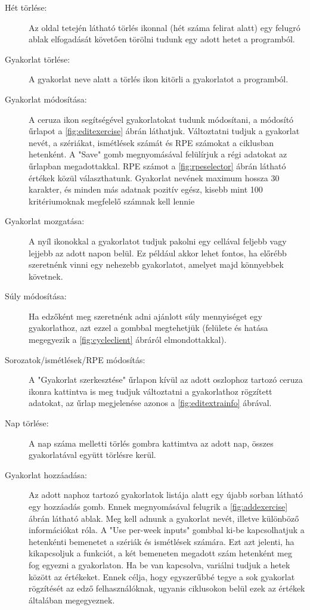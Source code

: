 \begin{description}
	\item[Hét törlése:] Az oldal tetején látható törlés ikonnal (hét száma felirat alatt) egy felugró ablak elfogadását követően törölni tudunk egy adott hetet a programból.
	\item[Gyakorlat törlése:] A gyakorlat neve alatt a törlés ikon kitörli a gyakorlatot a programból.
	\item[Gyakorlat módosítása:] A ceruza ikon segítségével gyakorlatokat tudunk módosítani, a módosító űrlapot a \ref{fig:editexercise} ábrán láthatjuk. Változtatni tudjuk a gyakorlat nevét, a szériákat, ismétlések számát és RPE számokat a ciklusban hetenként. A "Save" gomb megnyomásával felülírjuk a régi adatokat az űrlapban megadottakkal. RPE számot a \ref{fig:rpeselector} ábrán látható értékek közül választhatunk.
	Gyakorlat nevének maximum hossza 30 karakter, és minden más adatnak pozitív egész, kisebb mint 100 kritériumoknak megfelelő számnak kell lennie
	\item[Gyakorlat mozgatása:] A nyíl ikonokkal a gyakorlatot tudjuk pakolni egy cellával feljebb vagy lejjebb az adott napon belül. Ez például akkor lehet fontos, ha előrébb szeretnénk vinni egy nehezebb gyakorlatot, amelyet majd könnyebbek követnek.
	\item[Súly módosítása:] Ha edzőként meg szeretnénk adni ajánlott súly mennyiséget egy gyakorlathoz, azt ezzel a gombbal megtehetjük (felülete és hatása megegyezik a \ref{fig:cycleclient} ábráról elmondottakkal).
	\item[Sorozatok/ismétlések/RPE módosítás:] A "Gyakorlat szerkesztése" űrlapon kívül az adott oszlophoz tartozó ceruza ikonra kattintva is meg tudjuk változtatni a gyakorlathoz rögzített adatokat, az űrlap megjelenése azonos a \ref{fig:editextrainfo} ábrával.
	\item[Nap törlése:] A nap száma melletti törlés gombra kattimtva az adott nap, összes gyakorlatával együtt törlésre kerül.
	\item[Gyakorlat hozzáadása:] Az adott naphoz tartozó gyakorlatok listája alatt egy újabb sorban látható egy hozzáadás gomb. Ennek megnyomásával felugrik a \ref{fig:addexercise} ábrán látható ablak. Meg kell adnunk a  gyakorlat nevét, illetve különböző információkat róla. A "Use per-week inputs" gombbal ki-be kapcsolhatjuk a hetenkénti bemenetet a szériák és ismétlések számára. Ezt azt jelenti, ha kikapcsoljuk a funkciót, a két bemeneten megadott szám hetenként meg fog egyezni a gyakorlaton. Ha be van kapcsolva, variálni tudjuk a hetek között az értékeket. Ennek célja, hogy egyszerűbbé tegye a sok gyakorlat rögzítését az edző felhasználóknak, ugyanis ciklusokon belül ezek az értékek általában megegyeznek. 

\end{description}
